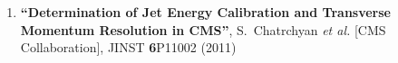 \begin{enumerate}
\item%
{\bf ``Determination of Jet Energy Calibration and Transverse Momentum Resolution in CMS''}, 
  S.~Chatrchyan {\it et al.}  [CMS Collaboration], 
JINST {\bf 6}P11002 (2011) %
\end{enumerate}

